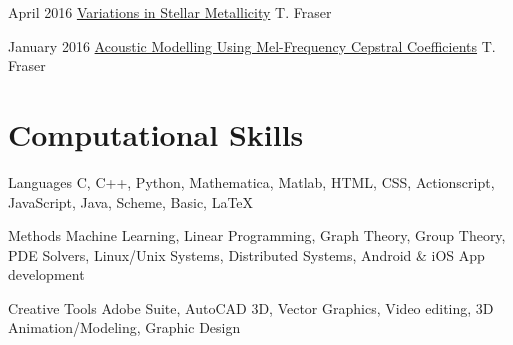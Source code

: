 \documentclass{article}
\begin{document}
        {
            \begin{paperlist}
                \item{April 2016}
                {\href{https://github.com/tcfraser/tcfraser.github.io/raw/master/documents/stellar_metallicity.pdf}{Variations in Stellar Metallicity}}
                {T. Fraser}
                {}
                \item{January 2016}
                {\href{https://github.com/tcfraser/tcfraser.github.io/raw/master/documents/MFCC.pdf}{Acoustic Modelling Using Mel-Frequency Cepstral Coefficients}}
                {T. Fraser}
                {}
            \end{paperlist}
        }

    \section{Computational Skills}
    \begin{computerlist}
        \item{Languages}
             {C, C++, Python, Mathematica, Matlab, HTML, CSS, Actionscript, JavaScript, Java, Scheme, Basic, LaTeX}
        \item{Methods}
             {Machine Learning, Linear Programming, Graph Theory, Group Theory, PDE Solvers, Linux/Unix Systems, Distributed Systems, Android \& iOS App development}
        \item{Creative Tools}
             {Adobe Suite, AutoCAD 3D, Vector Graphics, Video editing, 3D Animation/Modeling, Graphic Design}
    \end{computerlist}
    \clearpage
\end{document}
